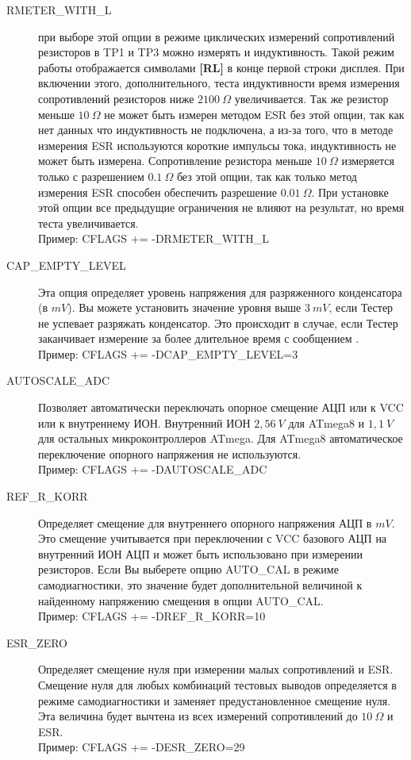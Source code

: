 \begin{description}
  \item[RMETER\_WITH\_L] при выборе этой опции в режиме циклических измерений сопротивлений резисторов в TP1 и TP3 
  можно измерять и индуктивность. Такой режим работы отображается символами \textbf{[RL]} в конце первой строки дисплея.
При включении этого, дополнительного, теста индуктивности время измерения сопротивлений резисторов 
ниже \(2100~\Omega\) увеличивается.
Так же резистор меньше \(10~\Omega\) не может быть измерен методом ESR без этой опции, так как нет 
данных что индуктивность не подключена, а из-за того, что в методе измерения ESR используются короткие 
импульсы тока, индуктивность не может быть измерена. Сопротивление резистора меньше \(10~\Omega\) измеряется только
с разрешением \(0.1~\Omega\) без этой опции, так как только метод измерения ESR способен обеспечить 
разрешение \(0.01~\Omega\).
При установке этой опции все предыдущие ограничения не влияют на результат, но время теста увеличивается.\\
Пример: CFLAGS += -DRMETER\_WITH\_L

  \item[CAP\_EMPTY\_LEVEL] Эта опция  определяет уровень напряжения для разряженного конденсатора (в \(mV\)). Вы можете 
установить значение уровня выше \(3~mV\), если Тестер не успевает разряжать конденсатор. Это происходит в случае, если 
Тестер заканчивает измерение за более длительное время с сообщением .\\
Пример: CFLAGS += -DCAP\_EMPTY\_LEVEL=3

  \item[AUTOSCALE\_ADC] Позволяет автоматически переключать опорное смещение АЦП или к VCC или к внутреннему ИОН. 
Внутренний ИОН \(2,56~V\) для ATmega8 и \(1,1~V\) для остальных микроконтроллеров ATmega.
Для ATmega8 автоматическое переключение опорного напряжения не используются.\\
Пример: CFLAGS += -DAUTOSCALE\_ADC

  \item[REF\_R\_KORR] Определяет смещение для внутреннего опорного напряжения АЦП в \(mV\). Это смещение учитывается 
при переключении с VCC базового АЦП на внутренний ИОН АЦП и может быть использовано при измерении резисторов. 
Если Вы выберете опцию AUTO\_CAL в режиме самодиагностики, это значение будет дополнительной величиной к найденному 
напряжению смещения в  опции AUTO\_CAL.\\
Пример: CFLAGS += -DREF\_R\_KORR=10

  \item[ESR\_ZERO] Определяет смещение нуля при измерении малых сопротивлений и ESR.
Смещение нуля для любых комбинаций тестовых выводов определяется в режиме самодиагностики
и заменяет предустановленное смещение нуля.
Эта величина будет вычтена из всех измерений сопротивлений до \(10~\Omega\) и ESR.\\
Пример: CFLAGS += -DESR\_ZERO=29


\end{description}
